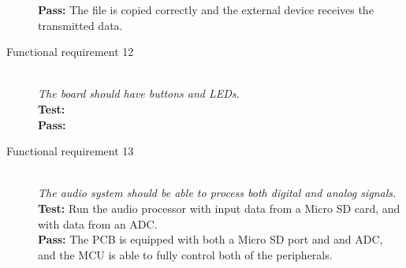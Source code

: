 \begin{description}
        \textbf{Pass:} The file is copied correctly and the external device receives the 
        transmitted data. \\
    \item[Functional requirement 12] \hfill \\
        \textit{The board should have buttons and LEDs.} \\
        \textbf{Test:} \\
        \textbf{Pass:} \\
    \item[Functional requirement 13] \hfill \\
        \textit{The audio system should be able to process both digital and analog signals.} \\
        \textbf{Test:} Run the audio processor with input data from a Micro SD card, and
        with data from an ADC. \\
        \textbf{Pass:} The PCB is equipped with both a Micro SD port and and ADC, and the
        MCU is able to fully control both of the peripherals.\\
\end{description}
